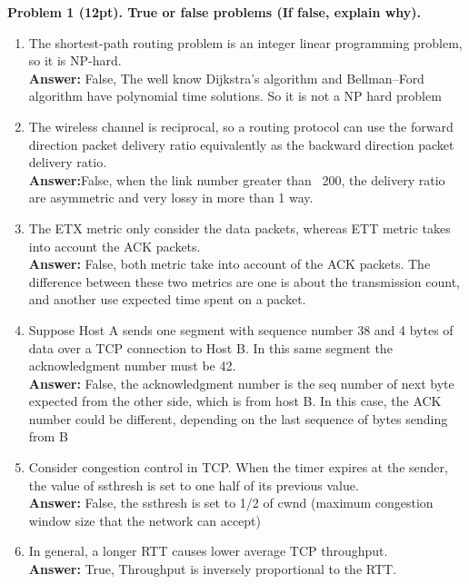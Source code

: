 \documentclass[12pt]{article}
\begin{document}
\noindent \textbf{Problem 1 (12pt). True or false problems (If false, explain why).\\}
\begin{enumerate}
\item The shortest-path routing problem is an integer linear programming problem, so it is NP-hard.\\
\textbf{Answer:} False, The well know Dijkstra's algorithm and Bellman–Ford algorithm
have polynomial time solutions. So it is not a NP hard problem
\item The wireless channel is reciprocal, so a routing protocol can use the forward direction packet delivery ratio equivalently as the backward direction packet delivery ratio.\\
\textbf{Answer:}False, when the link number greater than ~200, the delivery ratio are asymmetric and very lossy in more than 1 way.
\item The ETX metric only consider the data packets, whereas ETT metric takes into account the ACK packets.\\
\textbf{Answer:} False, both metric take into account of the ACK packets. The difference between these two metrics are one is about the transmission count, and another use expected time spent on a packet.
\item Suppose Host A sends one segment with sequence number 38 and 4 bytes of data over a TCP connection to Host B. In this same segment the acknowledgment number must be 42.\\
\textbf{Answer:} False, the acknowledgment number is the seq number of next byte expected from the other side, which is from host B. In this case, the ACK number could be different, depending on the last sequence of bytes sending from B
\item Consider congestion control in TCP. When the timer expires at the sender, the value of ssthresh is set to one half of its previous value.\\
\textbf{Answer:} False, the ssthresh is set to 1/2 of cwnd (maximum congestion window size that the network can accept)
\item In general, a longer RTT causes lower average TCP throughput.\\
\textbf{Answer:} True, Throughput is inversely proportional to the RTT.
\end{enumerate}
\end{document}
